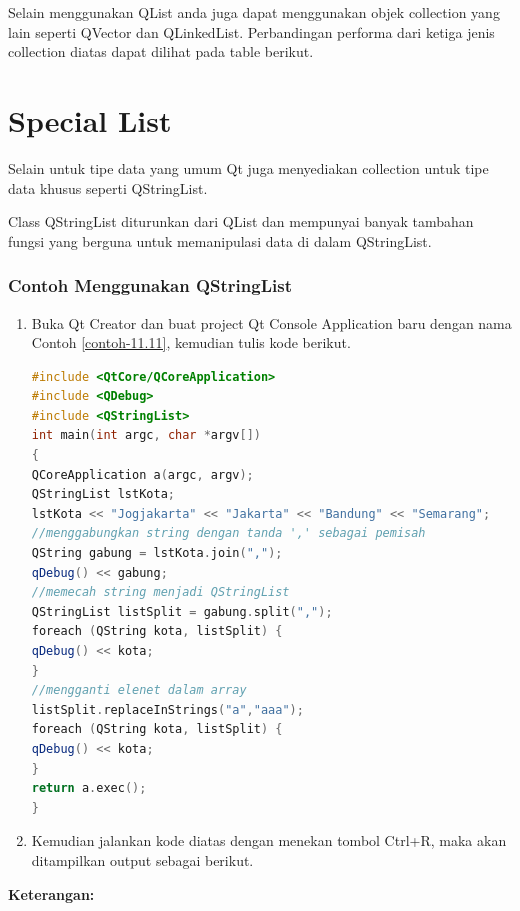 Selain menggunakan QList anda juga dapat menggunakan objek collection
yang lain seperti QVector dan QLinkedList. Perbandingan performa dari
ketiga jenis collection diatas dapat dilihat pada table berikut.

\section{Special List}\label{special-list}

Selain untuk tipe data yang umum Qt juga menyediakan collection untuk
tipe data khusus seperti QStringList.

Class QStringList diturunkan dari QList dan mempunyai banyak tambahan
fungsi yang berguna untuk memanipulasi data di dalam QStringList.

\subsubsection*{Contoh Menggunakan QStringList}

\begin{enumerate}

\item
  Buka Qt Creator dan buat project Qt Console Application baru dengan
  nama Contoh \ref{contoh-11.11}, kemudian tulis kode berikut.

\begin{lstlisting}[language=c++, caption=Menggunakan QStringList,label=contoh-11.11]
#include <QtCore/QCoreApplication>
#include <QDebug>
#include <QStringList>
int main(int argc, char *argv[])
{
QCoreApplication a(argc, argv);
QStringList lstKota;
lstKota << "Jogjakarta" << "Jakarta" << "Bandung" << "Semarang";
//menggabungkan string dengan tanda ',' sebagai pemisah
QString gabung = lstKota.join(",");
qDebug() << gabung;
//memecah string menjadi QStringList
QStringList listSplit = gabung.split(",");
foreach (QString kota, listSplit) {
qDebug() << kota;
}
//mengganti elenet dalam array
listSplit.replaceInStrings("a","aaa");
foreach (QString kota, listSplit) {
qDebug() << kota;
}
return a.exec();
}
\end{lstlisting}
\item
  Kemudian jalankan kode diatas dengan menekan tombol Ctrl+R, maka akan
  ditampilkan output sebagai berikut.
\end{enumerate}

\textbf{Keterangan:}

